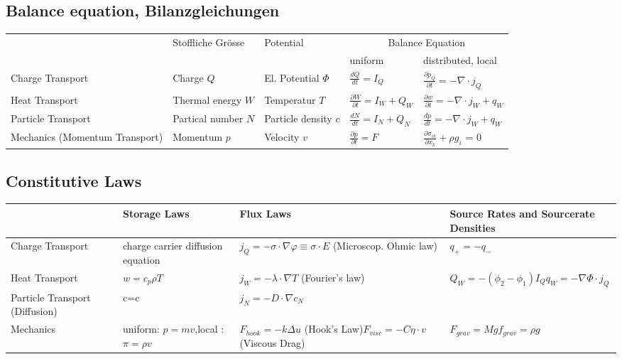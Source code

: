 {	\subsection{Balance equation, Bilanzgleichungen}
	{
		\begin{tabularx}{\linewidth}{XXXll}
			\hline
			& Stoffliche Grösse & Potential & \multicolumn{2}{c}{Balance Equation} \\
			& & & uniform & distributed, local \\ \hline
			Charge Transport & Charge $Q$ & El. Potential $\Phi$ & $\frac{dQ}{dt}=I_Q$ & $ \frac{\partial p_Q}{\partial t}=-\nabla\cdot j_Q$ \\ \hline
			Heat Transport & Thermal energy \newline $W$ & Temperatur $T$ & $\frac{\partial W}{\partial t}= I_W+Q_W$ & $\frac{\partial w}{\partial t}= -\nabla \cdot j_W+q_W$  \\ \hline
			Particle Transport & Partical number \newline $N$ & Particle density \newline $c$ & $\frac{dN}{dt}=I_N+Q_N$ & $\frac{dp}{dt}=-\nabla \cdot j_W +q_W$ \\ \hline
			Mechanics (Momentum Transport) & Momentum $p$ & Velocity $v$  & $\frac{\partial p}{\partial t}=F$ &  $\frac{\partial \sigma_{ik}}{\partial x_k} + \rho g_i$ = 0\\ 
			\hline
		\end{tabularx} }
		
		\subsection{Constitutive Laws}
		\begin{tabularx}{\linewidth}{Xp{3cm}p{4.55cm}X}
			\hline
			& Storage Laws & Flux Laws & Source Rates and Sourcerate Densities \\ \hline
			Charge Transport & charge carrier diffusion equation & $j_Q=-\sigma \cdot \nabla\varphi \equiv \sigma \cdot E$ \newline (Microscop. Ohmic law) & $q_+ = - q_-$ \\
			Heat Transport & $w=c_p \rho T$ & $j_W=-\lambda \cdot \nabla T$  (Fourier's law)& $Q_W = -(\phi_2-\phi_1)I_Q$\newline $q_W = -\nabla\Phi\cdot j_Q$  \\ 
			Particle Transport (Diffusion) & c=c & $j_N=- D \cdot \nabla c_N$ &  \\ 
			Mechanics & uniform: $p=mv$,\newline local : $\pi=\rho v$ & $F_{hook} = - k \Delta u$ (Hook's Law)\newline $F_{visc}=-C \eta \cdot v$ (Viscous Drag) & $F_{grav} = M g$\newline $f_{grav}=\rho g$ \\ 
			\hline
		\end{tabularx} 
}%
